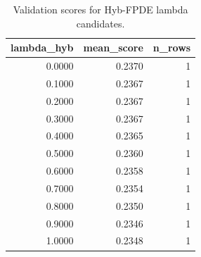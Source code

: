 \begin{table}[t]
\caption{Validation scores for Hyb-FPDE lambda candidates.}
\label{tab:lambda_distribution_computed}
\centering
\begin{tabular}{rrr}
\toprule
lambda\_hyb & mean\_score & n\_rows \\
\midrule
0.0000 & 0.2370 & 1 \\
0.1000 & 0.2367 & 1 \\
0.2000 & 0.2367 & 1 \\
0.3000 & 0.2367 & 1 \\
0.4000 & 0.2365 & 1 \\
0.5000 & 0.2360 & 1 \\
0.6000 & 0.2358 & 1 \\
0.7000 & 0.2354 & 1 \\
0.8000 & 0.2350 & 1 \\
0.9000 & 0.2346 & 1 \\
1.0000 & 0.2348 & 1 \\
\bottomrule
\end{tabular}

\end{table}
